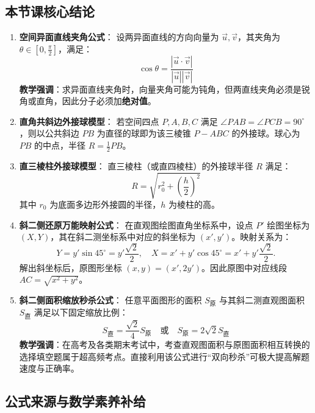 \documentclass[11pt,a4paper]{ctexart}
\begin{document}
\subsection{本节课核心结论}
\begin{enumerate}[label=\arabic*. , leftmargin=2em, itemsep=1.2em, topsep=0.2em]
  \item \textbf{空间异面直线夹角公式}：
  设两异面直线的方向向量为 $\vec{u}, \vec{v}$，其夹角为 $\theta \in \left[0, \frac{\pi}{2}\right]$，满足：
  \[ \cos\theta = \frac{|\vec{u} \cdot \vec{v}|}{|\vec{u}||\vec{v}|} \]
  \textbf{教学强调}：求异面直线夹角时，向量夹角可能为钝角，但两直线夹角必须是锐角或直角，因此分子必须加\textbf{绝对值}。
  
  \item \textbf{直角共斜边外接球模型}：
  若空间四点 $P, A, B, C$ 满足 $\angle PAB = \angle PCB = 90^\circ$，则以公共斜边 $PB$ 为直径的球即为该三棱锥 $P-ABC$ 的外接球。球心为 $PB$ 的中点，半径 $R = \frac{1}{2}PB$。
  
  \item \textbf{直三棱柱外接球模型}：
  直三棱柱（或直四棱柱）的外接球半径 $R$ 满足：
  \[ R = \sqrt{r_0^2 + \left(\frac{h}{2}\right)^2} \]
  其中 $r_0$ 为底面多边形外接圆的半径，$h$ 为棱柱的高。
  
  \item \textbf{斜二侧还原万能映射公式}：
  在直观图绘图直角坐标系中，设点 $P'$ 绘图坐标为 $(X, Y)$，其在斜二测坐标系中对应的斜坐标为 $(x', y')$。映射关系为：
  \[ Y = y'\sin 45^\circ = y'\frac{\sqrt{2}}{2},\quad X = x' + y'\cos 45^\circ = x' + y'\frac{\sqrt{2}}{2}. \]
  解出斜坐标后，原图形坐标 $(x, y) = (x', 2y')$。因此原图中对应线段 $AC = \sqrt{x^2 + y^2}$。
  
  \item \textbf{斜二侧面积缩放秒杀公式}：
  任意平面图形的面积 $S_{\text{原}}$ 与其斜二测直观图面积 $S_{\text{直}}$ 满足以下固定缩放比例：
  \[ S_{\text{直}} = \frac{\sqrt{2}}{4} S_{\text{原}} \quad \text{或} \quad S_{\text{原}} = 2\sqrt{2} S_{\text{直}} \]
  \textbf{教学强调}：在高考及各类期末考试中，考查直观图面积与原图面积相互转换的选择填空题属于超高频考点。直接利用该公式进行“双向秒杀”可极大提高解题速度与正确率。
\end{enumerate}

\subsection{公式来源与数学素养补给}
\end{document}
